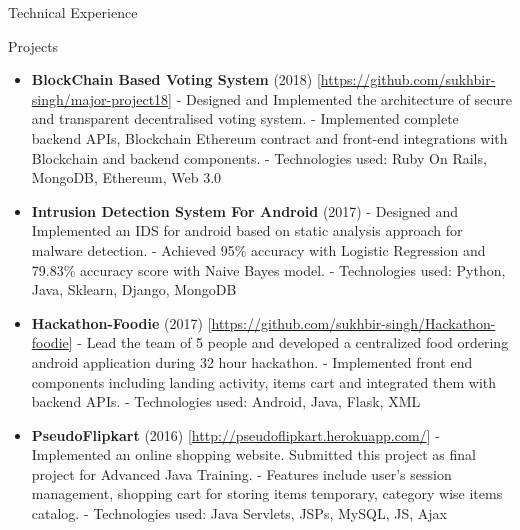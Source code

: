 \documentclass[]{mcdowellcv}
\begin{document}
	\begin{cvsection}{Technical Experience}
		\begin{cvsubsection}{Projects}{}{}
			\begin{itemize}
				\item \textbf{BlockChain Based Voting System} (2018) \textcolor[rgb]{.2,.2,.2}{[\href {https://github.com/sukhbir-singh/major-project18}{https://github.com/sukhbir-singh/major-project18}]}
				\newline- Designed and Implemented the architecture of secure and transparent decentralised voting system.
				\newline- Implemented complete backend APIs, Blockchain Ethereum contract and front-end integrations with Blockchain and backend components.
				\newline- Technologies used: Ruby On Rails, MongoDB, Ethereum, Web 3.0
				\newline
				\item \textbf{Intrusion Detection System For Android} (2017) 
				\newline- Designed and Implemented an IDS for android based on static analysis approach for malware detection.
				\newline- Achieved 95\% accuracy with Logistic Regression and 79.83\% accuracy score with Naive Bayes model.
				\newline- Technologies used: Python, Java, Sklearn, Django, MongoDB
				\newline
				\item \textbf{Hackathon-Foodie} (2017) \textcolor[rgb]{.2,.2,.2}{[\href {https://github.com/sukhbir-singh/Hackathon-foodie}{https://github.com/sukhbir-singh/Hackathon-foodie}]}
				\newline- Lead the team of 5 people and developed a centralized food ordering android application during 32 hour hackathon. 
				\newline- Implemented front end components including landing activity, items cart and integrated them with backend APIs. 
				\newline- Technologies used: Android, Java, Flask, XML
				\newline
				\item \textbf{PseudoFlipkart} (2016) \textcolor[rgb]{.2,.2,.2}{[\href {http://pseudoflipkart.herokuapp.com/}{http://pseudoflipkart.herokuapp.com/}]}
				\newline- Implemented an online shopping website. Submitted this project as final project for Advanced Java Training.
				\newline- Features include user's session management, shopping cart for storing items temporary, category wise items catalog. 
				\newline- Technologies used: Java Servlets, JSPs, MySQL, JS, Ajax

			\end{itemize}
		\end{cvsubsection}
	\end{cvsection}
\end{document}
